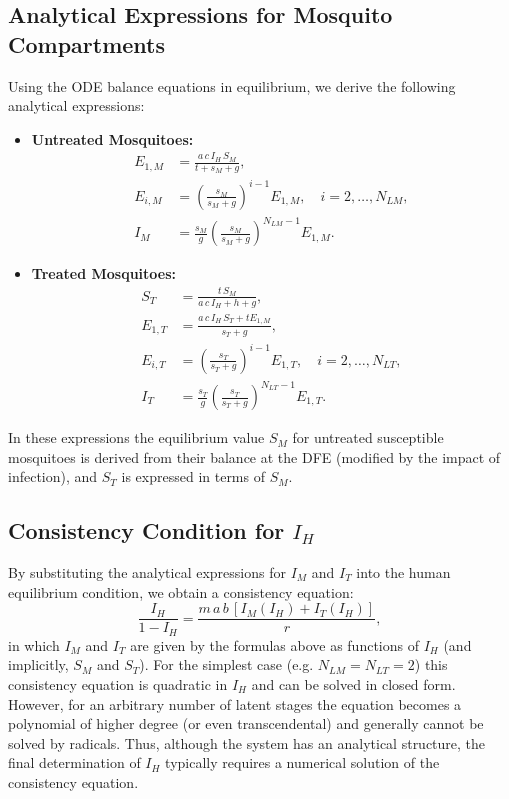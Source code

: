 \documentclass[12pt]{article}
\begin{document}
\subsection{Analytical Expressions for Mosquito Compartments}
Using the ODE balance equations in equilibrium, we derive the following analytical expressions:
\begin{itemize}
    \item \textbf{Untreated Mosquitoes:}
    \begin{align}
    E_{1,M} &= \frac{a\,c\,I_H\,S_M}{t + s_M + g},\\[1mm]
    E_{i,M} &= \left(\frac{s_M}{s_M+g}\right)^{i-1}E_{1,M}, \quad i=2,\dots, N_{LM},\\[1mm]
    I_M &= \frac{s_M}{g}\left(\frac{s_M}{s_M+g}\right)^{N_{LM}-1}E_{1,M}.
    \end{align}
    
    \item \textbf{Treated Mosquitoes:}
    \begin{align}
    S_T &= \frac{t\,S_M}{a\,c\,I_H + h + g},\\[1mm]
    E_{1,T} &= \frac{a\,c\,I_H\,S_T + tE_{1,M}}{s_T + g},\\[1mm]
    E_{i,T} &= \left(\frac{s_T}{s_T+g}\right)^{i-1}E_{1,T}, \quad i=2,\dots, N_{LT},\\[1mm]
    I_T &= \frac{s_T}{g}\left(\frac{s_T}{s_T+g}\right)^{N_{LT}-1}E_{1,T}.
    \end{align}
\end{itemize}

In these expressions the equilibrium value \(S_M\) for untreated susceptible mosquitoes is derived from their balance at the DFE (modified by the impact of infection), and \(S_T\) is expressed in terms of \(S_M\).

\subsection{Consistency Condition for \(I_H\)}
By substituting the analytical expressions for \(I_M\) and \(I_T\) into the human equilibrium condition, we obtain a consistency equation:
\[
\frac{I_H}{1-I_H} = \frac{m\,a\,b\,\left[I_M(I_H)+I_T(I_H)\right]}{r},
\]
in which \(I_M\) and \(I_T\) are given by the formulas above as functions of \(I_H\) (and implicitly, \(S_M\) and \(S_T\)). For the simplest case (e.g. \(N_{LM}=N_{LT}=2\)) this consistency equation is quadratic in \(I_H\) and can be solved in closed form. However, for an arbitrary number of latent stages the equation becomes a polynomial of higher degree (or even transcendental) and generally cannot be solved by radicals. Thus, although the system has an analytical structure, the final determination of \(I_H\) typically requires a numerical solution of the consistency equation.
\end{document}

